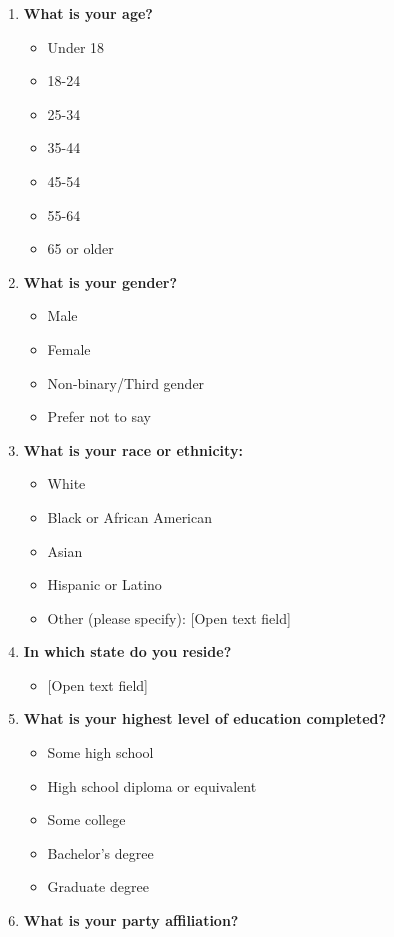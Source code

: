 \documentclass[
  letterpaper,
  DIV=11,
  numbers=noendperiod]{scrartcl}
\providecommand{\tightlist}{%
  \setlength{\itemsep}{0pt}\setlength{\parskip}{0pt}}\usepackage{longtable,booktabs,array}
\begin{document}
\begin{enumerate}
\def\labelenumi{\arabic{enumi}.}
\item
  \textbf{What is your age?}

  \begin{itemize}
  \item
    Under 18
  \item
    18-24
  \item
    25-34
  \item
    35-44
  \item
    45-54
  \item
    55-64
  \item
    65 or older
  \end{itemize}
\item
  \textbf{What is your gender?}

  \begin{itemize}
  \item
    Male
  \item
    Female
  \item
    Non-binary/Third gender
  \item
    Prefer not to say
  \end{itemize}
\item
  \textbf{What is your race or ethnicity:}

  \begin{itemize}
  \item
    White
  \item
    Black or African American
  \item
    Asian
  \item
    Hispanic or Latino
  \item
    Other (please specify): {[}Open text field{]}
  \end{itemize}
\item
  \textbf{In which state do you reside?}

  \begin{itemize}
  \tightlist
  \item
    {[}Open text field{]}
  \end{itemize}
\item
  \textbf{What is your highest level of education completed?}

  \begin{itemize}
  \item
    Some high school
  \item
    High school diploma or equivalent
  \item
    Some college
  \item
    Bachelor's degree
  \item
    Graduate degree
  \end{itemize}
\item
  \textbf{What is your party affiliation?}


\end{enumerate}
\end{document}
